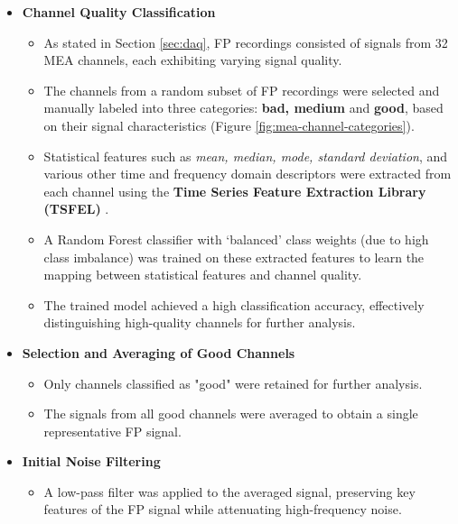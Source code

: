 \documentclass{report}
\begin{document}
    \begin{itemize}
        \item \textbf{Channel Quality Classification}  
        \begin{itemize}
            \item As stated in Section \ref{sec:daq}, FP recordings consisted of signals from 32 MEA channels, each exhibiting varying signal quality.
            \item The channels from a random subset of FP recordings were selected and manually labeled into three categories: \textbf{bad, medium} and \textbf{good}, based on their signal characteristics (Figure \ref{fig:mea-channel-categories}).
            \item Statistical features such as \textit{mean, median, mode, standard deviation}, and various other time and frequency domain descriptors were extracted from each channel using the \textbf{Time Series Feature Extraction Library (TSFEL)} \cite{barandas2020tsfel}.
            \item A Random Forest classifier with `balanced' class weights (due to high class imbalance) was trained on these extracted features to learn the mapping between statistical features and channel quality.
            \item The trained model achieved a high classification accuracy, effectively distinguishing high-quality channels for further analysis.
        \end{itemize}
    
        \item \textbf{Selection and Averaging of Good Channels}  
        \begin{itemize}
            \item Only channels classified as "good" were retained for further analysis.
            \item The signals from all good channels were averaged to obtain a single representative FP signal.
        \end{itemize}
    
        \item \textbf{Initial Noise Filtering}  
        \begin{itemize}
            \item A low-pass filter was applied to the averaged signal, preserving key features of the FP signal while attenuating high-frequency noise.
        \end{itemize}
    \end{itemize}
    
\end{document}
